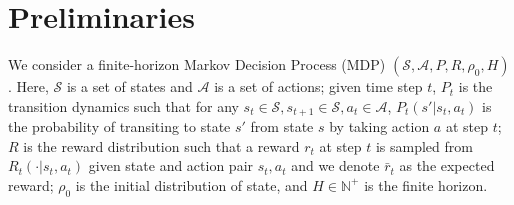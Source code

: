 \documentclass{article}
\newcommand{\BB}[1]{\textcolor{red}{\bf Byron: {#1}}}
\begin{document}

\section{Preliminaries}
We consider a finite-horizon Markov Decision Process (MDP) $(\mathcal{S}, \mathcal{A}, P, R, \rho_0, H)$. Here,  $\mathcal{S}$ is a set of states and $\mathcal{A}$ is a set of actions; given time step $t$, $P_t$ is the transition dynamics such that for any $s_t\in\mathcal{S},s_{t+1}\in\mathcal{S}, a_t\in\mathcal{A}$, $P_t(s'|s_t, a_t)$ is the probability of transiting to state $s'$ from state $s$ by taking action $a$ at step $t$; $R$ is the reward distribution such that a reward $r_t$ at step $t$ is sampled from $R_t(\cdot | s_t, a_t)$ given state and action pair $s_t,a_t$ and we denote $\bar{r}_t$ as the expected reward; $\rho_0$ is the initial distribution of state, and $H\in\mathbb{N}^+$ is the finite horizon. 
\end{document}
